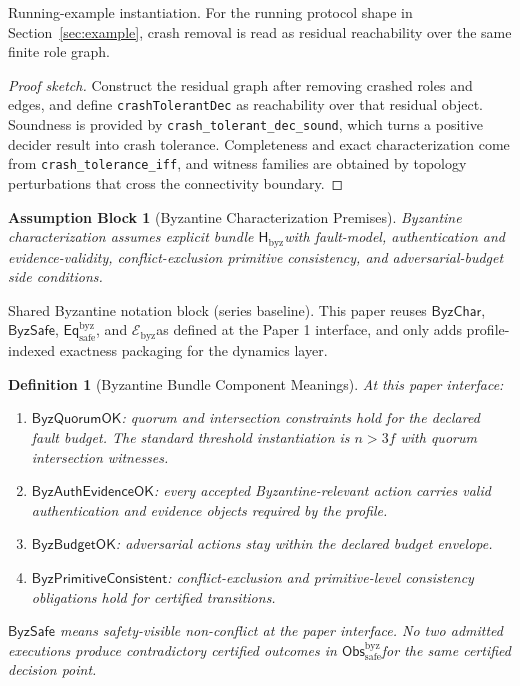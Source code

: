 \documentclass[a4paper,10pt,twocolumn,english]{article}
\numberwithin{equation}{section}
\theoremstyle{paperdef}
\newtheorem{definition}{Definition}[section]
\theoremstyle{paperplain}
\theoremstyle{paperdef}
\newtheorem{assumption}{Assumption Block}[section]
\theoremstyle{paperremark}
\newcommand{\Hbyz}{\ensuremath{\mathsf{H}_{\mathrm{byz}}}}
\newcommand{\Obssafe}{\ensuremath{\mathsf{Obs}_{\mathrm{safe}}^{\mathrm{byz}}}}
\newcommand{\Eqsafe}{\ensuremath{\mathsf{Eq}_{\mathrm{safe}}^{\mathrm{byz}}}}
\newcommand{\Ebyz}{\ensuremath{\mathcal{E}_{\mathrm{byz}}}}
\newcommand{\ByzSafe}{\ensuremath{\mathsf{ByzSafe}}}
\newcommand{\ByzChar}{\ensuremath{\mathsf{ByzChar}}}
\begin{document}
Running-example instantiation. For the running protocol shape in
Section~\ref{sec:example}, crash removal is read as residual reachability over
the same finite role graph.

\begin{proof}[Proof sketch]
	Construct the residual graph after removing crashed roles and edges, and define \texttt{crashTolerantDec} as reachability over that residual object. Soundness is provided by \nolinkurl{crash_tolerant_dec_sound}, which turns a positive decider result into crash tolerance. Completeness and exact characterization come from \nolinkurl{crash_tolerance_iff}, and witness families are obtained by topology perturbations that cross the connectivity boundary.
\end{proof}

\begin{assumption}[Byzantine Characterization Premises]
	\label{assump:p2-byzantine}
	Byzantine characterization assumes explicit bundle \Hbyz with fault-model, authentication and evidence-validity, conflict-exclusion primitive consistency, and adversarial-budget side conditions.
\end{assumption}

Shared Byzantine notation block (series baseline). This paper reuses
$\ByzChar$, $\ByzSafe$, \Eqsafe, and \Ebyz as defined at the Paper 1 interface,
and only adds profile-indexed exactness packaging for the dynamics layer.

\begin{definition}[Byzantine Bundle Component Meanings]
	At this paper interface:
	\begin{enumerate}
		\item $\mathsf{ByzQuorumOK}$: quorum and intersection constraints hold for the declared fault budget. The standard threshold instantiation is $n>3f$ with quorum intersection witnesses.
		\item $\mathsf{ByzAuthEvidenceOK}$: every accepted Byzantine-relevant action carries valid authentication and evidence objects required by the profile.
		\item $\mathsf{ByzBudgetOK}$: adversarial actions stay within the declared budget envelope.
		\item $\mathsf{ByzPrimitiveConsistent}$: conflict-exclusion and primitive-level consistency obligations hold for certified transitions.
	\end{enumerate}
	$\ByzSafe$ means safety-visible non-conflict at the paper interface. No two admitted executions produce contradictory certified outcomes in \Obssafe for the same certified decision point.
\end{definition}
\end{document}
